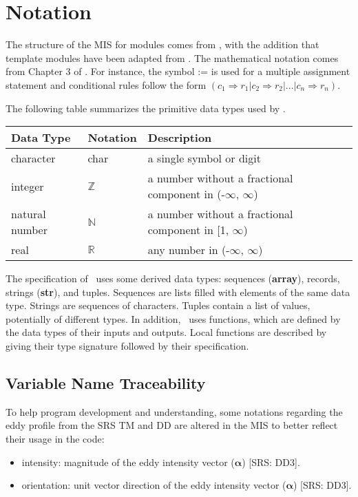\documentclass[12pt, titlepage]{article}
\begin{document}
\section{Notation}


The structure of the MIS for modules comes from \citet{HoffmanAndStrooper1995},
with the addition that template modules have been adapted from
\cite{GhezziEtAl2003}.  The mathematical notation comes from Chapter 3 of
\citet{HoffmanAndStrooper1995}.  For instance, the symbol := is used for a
multiple assignment statement and conditional rules follow the form $(c_1
\Rightarrow r_1 | c_2 \Rightarrow r_2 | ... | c_n \Rightarrow r_n )$.

The following table summarizes the primitive data types used by \progname. 

\begin{center}
\renewcommand{\arraystretch}{1.2}
\noindent 
\begin{tabular}{l l p{7.5cm}} 
\toprule 
\textbf{Data Type} & \textbf{Notation} & \textbf{Description}\\ 
\midrule
character & char & a single symbol or digit\\
integer & $\mathbb{Z}$ & a number without a fractional component in (-$\infty$, $\infty$) \\
natural number & $\mathbb{N}$ & a number without a fractional component in [1, $\infty$) \\
real & $\mathbb{R}$ & any number in (-$\infty$, $\infty$)\\
\bottomrule
\end{tabular} 
\end{center}

\noindent
The specification of \progname \ uses some derived data types: sequences (\textbf{array}), records, strings (\textbf{str}), and
tuples. Sequences are lists filled with elements of the same data type. Strings
are sequences of characters. Tuples contain a list of values, potentially of
different types. In addition, \progname \ uses functions, which
are defined by the data types of their inputs and outputs. Local functions are
described by giving their type signature followed by their specification.

\subsection{Variable Name Traceability}
To help program development and understanding, some notations regarding the eddy profile from the SRS TM and DD are altered in the MIS to better reflect their usage in the code:
\begin{itemize}
  \item intensity: magnitude of the eddy intensity vector ($\boldsymbol{\alpha}$) [SRS: DD3].
  \item orientation: unit vector direction of the eddy intensity vector ($\boldsymbol{\alpha}$) [SRS: DD3].
\end{itemize}
\end{document}

